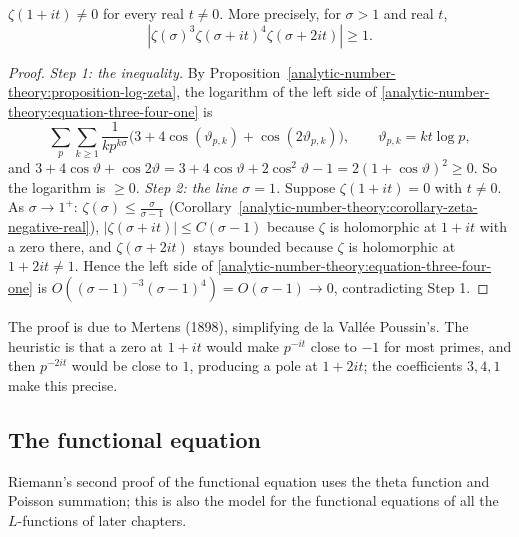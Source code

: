 \begin{theorem}\label{analytic-number-theory:theorem-zeta-nonvanishing}
$\zeta(1 + it) \neq 0$ for every real $t \neq 0$. More precisely, for $\sigma > 1$ and real $t$,
\begin{equation}\label{analytic-number-theory:equation-three-four-one}
|\zeta(\sigma)^3\zeta(\sigma + it)^4\zeta(\sigma + 2it)| \geq 1.
\end{equation}
\end{theorem}

\begin{proof}
\emph{Step 1: the inequality.} By Proposition~\ref{analytic-number-theory:proposition-log-zeta}, the logarithm of the left side of \eqref{analytic-number-theory:equation-three-four-one} is
\[
\sum_p\sum_{k \geq 1}\frac{1}{kp^{k\sigma}}\bigl(3 + 4\cos(\vartheta_{p,k}) + \cos(2\vartheta_{p,k})\bigr), \qquad \vartheta_{p,k} = kt\log p,
\]
and $3 + 4\cos\vartheta + \cos 2\vartheta = 3 + 4\cos\vartheta + 2\cos^2\vartheta - 1 = 2(1 + \cos\vartheta)^2 \geq 0$. So the logarithm is $\geq 0$.
\emph{Step 2: the line $\sigma = 1$.} Suppose $\zeta(1 + it) = 0$ with $t \neq 0$. As $\sigma \to 1^+$: $\zeta(\sigma) \leq \frac{\sigma}{\sigma - 1}$ (Corollary~\ref{analytic-number-theory:corollary-zeta-negative-real}),
$|\zeta(\sigma + it)| \leq C(\sigma - 1)$ because $\zeta$ is holomorphic at $1 + it$ with a zero there, and $\zeta(\sigma + 2it)$ stays bounded because $\zeta$ is holomorphic at $1 + 2it \neq 1$. Hence
the left side of \eqref{analytic-number-theory:equation-three-four-one} is $O((\sigma - 1)^{-3}(\sigma - 1)^4) = O(\sigma - 1) \to 0$, contradicting Step 1.
\end{proof}

The proof is due to Mertens (1898), simplifying de la Vallée Poussin's. The heuristic is that a zero at $1 + it$ would make $p^{-it}$ close to $-1$ for most primes, and then $p^{-2it}$ would be close to
$1$, producing a pole at $1 + 2it$; the coefficients $3, 4, 1$ make this precise.

\subsection{The functional equation}\label{analytic-number-theory:subsection-functional-equation}

Riemann's second proof of the functional equation uses the theta function and Poisson summation; this is also the model for the functional equations of all the $L$-functions of later chapters.

